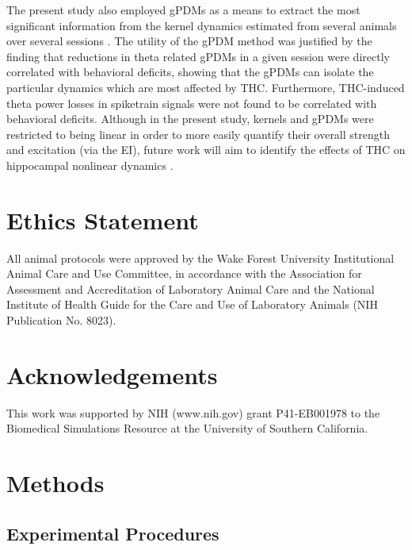 \documentclass[11pt,a4paper,final]{article}
\begin{document}
The present study also employed gPDMs as a means to extract the most significant information from the kernel dynamics estimated from several animals over several sessions \citep{marm04,marm14,sandler14,sandler15clpp}.
The utility of the gPDM method was justified by the finding that reductions in theta related gPDMs in a given session were directly correlated with behavioral deficits, showing that the gPDMs can isolate the particular dynamics which are most affected by THC.
Furthermore, THC-induced theta power losses in spiketrain signals were not found to be correlated with behavioral deficits.
Although in the present study, kernels and gPDMs were restricted to being linear in order to more easily quantify their overall strength and excitation (via the EI), future work will aim to identify the effects of THC on hippocampal nonlinear dynamics \citep{song07,sandler15}.

\section*{Ethics Statement}
All animal protocols were approved by the Wake Forest University Institutional Animal Care and Use Committee, in accordance with the Association for Assessment and Accreditation of Laboratory Animal Care and the National Institute of Health Guide for the Care and Use of Laboratory Animals (NIH Publication No. 8023).

\section*{Acknowledgements}
This work was supported by NIH (www.nih.gov) grant P41-EB001978 to the Biomedical Simulations Resource at the University of Southern California.

\section{Methods \label{meth}}

    \subsection{Experimental Procedures \label{expmeth}}
\end{document}
